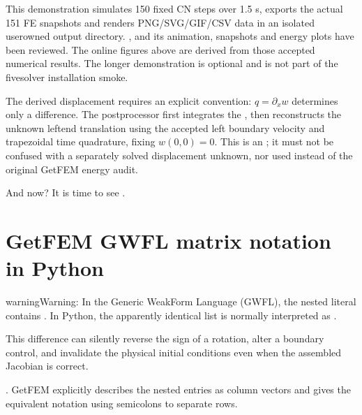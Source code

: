\documentclass[letterpaper,10pt,english]{sphinxmanual}
\begin{document}
\sphinxAtStartPar
This  demonstration simulates 150 fixed CN
steps over 1.5 s, exports the actual 151 FE snapshots and renders
PNG/SVG/GIF/CSV data in an isolated user\sphinxhyphen{}owned output directory.
, and its animation,
snapshots and energy plots have been reviewed. The online
figures above are derived from those accepted numerical results.
The longer demonstration is optional and is not part of the
five\sphinxhyphen{}solver installation smoke.

\sphinxAtStartPar
The derived displacement requires an explicit convention:
\(q=\partial_x w\) determines only a 
difference. The postprocessor first integrates the , then reconstructs the unknown
left\sphinxhyphen{}end translation using the accepted left boundary velocity
and trapezoidal time quadrature, fixing \(w(0,0)=0\).
This is an ;
it must not be confused with a separately solved displacement
unknown, nor used instead of the original GetFEM energy audit.

\sphinxAtStartPar
And now? It is time to see .

\sphinxstepscope


\section{GetFEM GWFL matrix notation in Python}
\label{\detokenize{getfem_gwfl:getfem-gwfl-matrix-notation-in-python}}\label{\detokenize{getfem_gwfl::doc}}\label{\detokenize{getfem_gwfl:gwfl-matrix-convention}}
\begin{sphinxadmonition}{warning}{Warning:}
\sphinxAtStartPar
{}
In the Generic Weak\sphinxhyphen{}Form Language (GWFL), the nested literal
\sphinxcode{\sphinxupquote{{[}{[}a,b{]},{[}c,d{]}{]}}} contains . In Python,
the apparently identical list \sphinxcode{\sphinxupquote{{[}{[}a,b{]},{[}c,d{]}{]}}} is normally
interpreted as .

\sphinxAtStartPar
This difference can silently reverse the sign of a rotation,
alter a boundary control, and invalidate the physical initial
conditions even when the assembled Jacobian is correct.

\sphinxAtStartPar
{} .
GetFEM explicitly describes the nested entries as column vectors
and gives the equivalent notation using semicolons to separate rows.
\end{sphinxadmonition}
\end{document}
